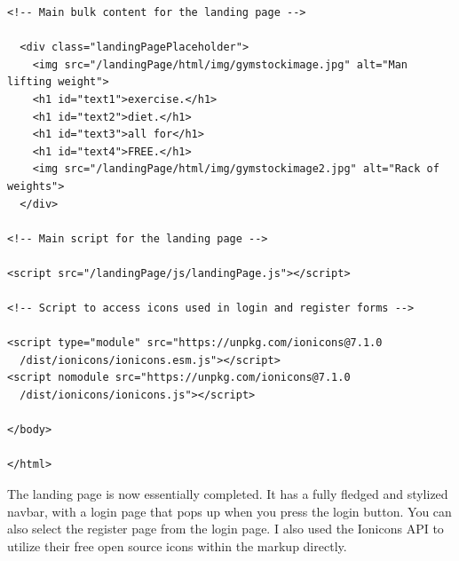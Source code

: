 \documentclass{article}
\begin{document}
\begin{lstlisting}[caption={landingpage.html}]
<!-- Main bulk content for the landing page -->

  <div class="landingPagePlaceholder">
    <img src="/landingPage/html/img/gymstockimage.jpg" alt="Man lifting weight">
    <h1 id="text1">exercise.</h1>
    <h1 id="text2">diet.</h1>
    <h1 id="text3">all for</h1>
    <h1 id="text4">FREE.</h1>
    <img src="/landingPage/html/img/gymstockimage2.jpg" alt="Rack of weights">
  </div>

<!-- Main script for the landing page -->

<script src="/landingPage/js/landingPage.js"></script>

<!-- Script to access icons used in login and register forms -->

<script type="module" src="https://unpkg.com/ionicons@7.1.0
  /dist/ionicons/ionicons.esm.js"></script>
<script nomodule src="https://unpkg.com/ionicons@7.1.0
  /dist/ionicons/ionicons.js"></script>

</body>

</html>
\end{lstlisting}

The landing page is now essentially completed. It has a fully fledged and stylized navbar, with a login page that pops up when you press the login button. You can also select the register page from the login page. I also used the Ionicons API to utilize their free open source icons within the markup directly.
\end{document}
